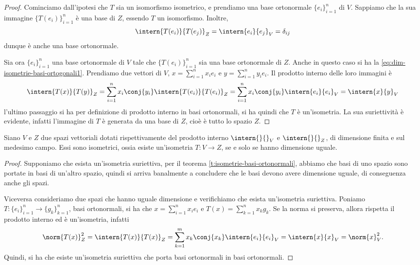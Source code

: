 \begin{proof}
	Cominciamo dall'ipotesi che $T$ sia un isomorfismo isometrico, e prendiamo una base ortonormale $\{  e_i\}_{i=1}^n$ di $V$.
	Sappiamo che la sua immagine $\{T(  e_i)\}_{i=1}^n$ è una base di $Z$, essendo $T$ un isomorfismo.
	Inoltre,
	\begin{equation}
		\intern{T(  e_i)}{T(  e_j)}_Z=\intern{  e_i}{  e_j}_V=\delta_{ij}
		\label{eq:dim-isometrie-basi-ortogonali1}
	\end{equation}
	dunque è anche una base ortonormale.

	Sia ora $\{  e_i\}_{i=1}^n$ una base ortonormale di $V$ tale che $\{T(  e_i)\}_{i=1}^n$ sia una base ortonormale di $Z$.
	Anche in questo caso si ha la \eqref{eq:dim-isometrie-basi-ortogonali1}.
	Prendiamo due vettori di $V$, $  x=\sum_{i=1}^nx_i  e_i$ e $  y=\sum_{i=1}^ny_i  e_i$.
	Il prodotto interno delle loro immagini è
	\begin{equation}
		\intern{T(  x)}{T(  y)}_Z=\sum_{i=1}^nx_i\conj{y_i}\intern{T(  e_i)}{T(  e_i)}_Z=\sum_{i=1}^nx_i\conj{y_i}\intern{  e_i}{  e_i}_V=\intern{  x}{  y}_V
	\end{equation}
	l'ultimo passaggio si ha per definizione di prodotto interno in basi ortonormali, si ha quindi che $T$ è un'isometria.
	La sua suriettività è evidente, infatti l'immagine di $T$ è generata da una base di $Z$, cioè è tutto lo spazio $Z$.
\end{proof}

\begin{corollario} \label{t:spazi-isometrici}
	Siano $V$ e $Z$ due spazi vettoriali dotati rispettivamente del prodotto interno $\intern{}{}_V$ e $\intern{}{}_Z$, di dimensione finita e sul medesimo campo.
	Essi sono isometrici, ossia esiste un'isometria $T\colon V\to Z$, se e solo se hanno dimensione uguale.
\end{corollario}
\begin{proof}
	Supponiamo che esista un'isometria suriettiva, per il teorema \ref{t:isometrie-basi-ortonormali}, abbiamo che basi di uno spazio sono portate in basi di un'altro spazio, quindi si arriva banalmente a concludere che le basi devono avere dimensione uguale, di conseguenza anche gli spazi. 
	
	Viceversa consideriamo due spazi che hanno uguale dimensione e verifichiamo che esista un'isometria suriettiva.
	Poniamo $T\colon \{e_i\}_{i=1}^n\to \{g_k\}_{k=1}^n$, basi ortonormali, si ha che $  x = \sum_{i=1}^n x_i e_i$ e $T(  x) = \sum_{k=1}^n x_k g_k$.
	Se la norma si preserva, allora rispetta il prodotto interno ed è un'isometria, infatti
	\begin{equation*}
		\norm{T(  x)}_Z^2 = \intern{T(x)}{T(x)}_Z = \sum_{k=1}^m x_k \conj {x_k} \intern{e_i}{e_i}_V = \intern{  x}{  x}_V = \norm {x}_V^2.
	\end{equation*}
	Quindi, si ha che esiste un'isometria suriettiva che porta basi ortonormali in basi ortonormali.
\end{proof}


